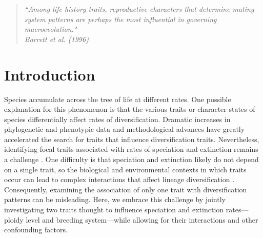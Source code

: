 \begin{quote}
\em{``Among life history traits, reproductive characters that determine mating system patterns are perhaps the most influential in governing macroevolution." 
}
\\
\hspace*{\fill}\rm{ Barrett et al. (1996)}
\end{quote}

\section{Introduction}

Species accumulate across the tree of life at different rates. 
One possible explanation for this phenomenon is that the various traits or character states of species differentially affect rates of diversification. 
Dramatic increases in phylogenetic and phenotypic data and methodological advances have greatly accelerated the search for traits that influence diversification traits.
Nevertheless, identifying focal traits associated with rates of speciation and extinction remains a challenge \citep[\eg][]{maddison_2015, rabosky_2015, moore_2016, fitzjohn_2009, goldberg_2012, beaulieu_2016, rabosky_2017}. 
One difficulty is that speciation and extinction likely do not depend on a single trait, so the biological and environmental contexts in which traits occur can lead to complex interactions that affect lineage diversification \citep{beaulieu_2016, caetano_2018, herrera_2018}.
Consequently, examining the association of only one trait with diversification patterns can be misleading. 
Here, we embrace this challenge by jointly investigating two traits thought to influence speciation and extinction rates---ploidy level and breeding system---while allowing for their interactions and other confounding factors.

